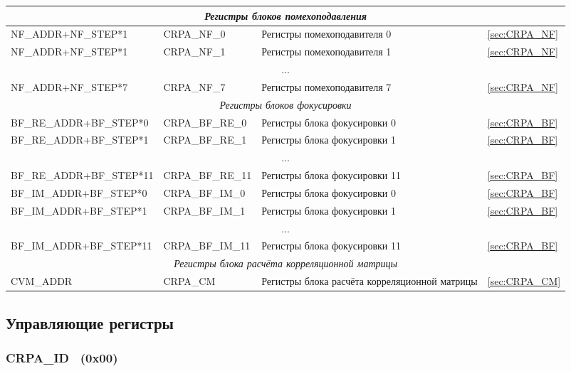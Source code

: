\begin{longtable}{|p{30mm}|p{55mm}|p{6cm}|p{15mm}|}
\multicolumn{4}{|c|}{\textit{Регистры блоков помехоподавления}} \\
\hline
\tiny NF\_ADDR+NF\_STEP*1 & CRPA\_NF\_0      	& Регистры помехоподавителя 0 			& \ref{sec:CRPA_NF} \\
\hline
\tiny NF\_ADDR+NF\_STEP*1 & CRPA\_NF\_1      	& Регистры помехоподавителя 1 		        & \ref{sec:CRPA_NF} \\
\hline
\multicolumn{4}{|c|}{...} \\
\hline
\tiny NF\_ADDR+NF\_STEP*7 & CRPA\_NF\_7      	& Регистры помехоподавителя 7 		        & \ref{sec:CRPA_NF} \\
\hline
\multicolumn{4}{|c|}{\textit{Регистры блоков фокусировки}} \\
\hline
\tiny BF\_RE\_ADDR+BF\_STEP*0  & CRPA\_BF\_RE\_0  & Регистры блока фокусировки 0 		& \ref{sec:CRPA_BF} \\
\hline
\tiny BF\_RE\_ADDR+BF\_STEP*1  & CRPA\_BF\_RE\_1  & Регистры блока фокусировки 1 		& \ref{sec:CRPA_BF} \\
\hline
\multicolumn{4}{|c|}{...} \\
\hline
\tiny BF\_RE\_ADDR+BF\_STEP*11 & CRPA\_BF\_RE\_11 & Регистры блока фокусировки 11		& \ref{sec:CRPA_BF} \\
\hline
\tiny BF\_IM\_ADDR+BF\_STEP*0  & CRPA\_BF\_IM\_0  & Регистры блока фокусировки 0 		& \ref{sec:CRPA_BF} \\
\hline
\tiny BF\_IM\_ADDR+BF\_STEP*1  & CRPA\_BF\_IM\_1  & Регистры блока фокусировки 1 		& \ref{sec:CRPA_BF} \\
\hline
\multicolumn{4}{|c|}{...} \\
\hline
\tiny BF\_IM\_ADDR+BF\_STEP*11 & CRPA\_BF\_IM\_11 & Регистры блока фокусировки 11		& \ref{sec:CRPA_BF} \\
\hline
\multicolumn{4}{|c|}{\textit{Регистры блока расчёта корреляционной матрицы}} \\
\hline
\tiny CVM\_ADDR    & CRPA\_CM         	& Регистры блока расчёта корреляционной матрицы & \ref{sec:CRPA_CM} \\
\hline
\end{longtable}


\subsection{Управляющие регистры}

\subsubsection{CRPA\_ID~ (0x00)}
\renewcommand{\regnam}{CRPA\_ID~}
\label{sec:CRPA_ID}

